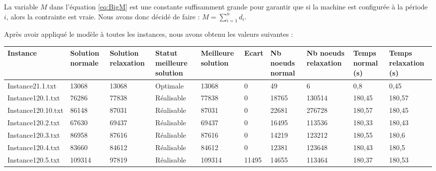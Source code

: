 \documentclass[a4paper,12pt]{article}
\theoremstyle{blueDefinition}
\theoremstyle{redProperty}
\begin{document}
La variable $M$ dans l'équation \ref{eq:BigM} est une constante suffisamment grande pour garantir que si la machine est configurée à la période $i$, alors la contrainte est vraie.
Nous avons donc décidé de faire : $ M = \sum_{i=1}^{n} d_i $.

Après avoir appliqué le modèle à toutes les instances, nous avons obtenu les valeurs suivantes :

\begin{table}[htbp]
\hspace*{-2cm} 
\begin{tabular}{|l|p{40pt}|p{40pt}|p{55pt}|p{45pt}|p{35pt}|p{35pt}|p{35pt}|p{35pt}|p{35pt}|}
\hline Instance           & Solution normale & Solution relaxation & Statut meilleure solution & Meilleure solution & Ecart & Nb noeuds normal & Nb noeuds relaxation & Temps normal (s) & Temps relaxation (s) \\ \hline
Instance21.1.txt   & 13068            & 13068               & Optimale                  & 13068              & 0          & 49               & 6                    & 0,8              & 0,45                 \\
Instance120.1.txt  & 76286            & 77838               & Réalisable                & 77838              & 0          & 18765            & 130514               & 180,45           & 180,57               \\
Instance120.10.txt & 86148            & 87031               & Réalisable                & 87031              & 0          & 22681            & 276728               & 180,57           & 180,45               \\
Instance120.2.txt  & 67630            & 69437               & Réalisable                & 69437              & 0          & 16495            & 113536               & 180,33           & 180,43               \\
Instance120.3.txt  & 86958            & 87616               & Réalisable                & 87616              & 0          & 14219            & 123212               & 180,55           & 180,6                \\
Instance120.4.txt  & 83660            & 84612               & Réalisable                & 84612              & 0          & 12381            & 123648               & 180,43           & 180,5                \\
Instance120.5.txt  & 109314           & 97819               & Réalisable                & 109314             & 11495      & 14655            & 113464               & 180,37           & 180,53               \\

\end{tabular}
\end{table}
\end{document}
